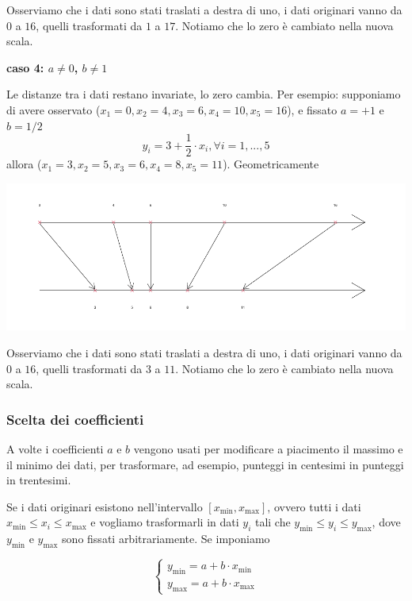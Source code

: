 \documentclass[
  11pt,
]{book}
\theoremstyle{mytheoremstyle}
\theoremstyle{mydefstyle}
\begin{document}
Osserviamo che i dati sono stati traslati a destra di uno, i dati originari vanno da \(0\) a \(16\), quelli trasformati da \(1\) a \(17\). Notiamo che lo zero è cambiato nella nuova scala.

\textbf{caso 4: \(a\ne 0\), \(b\ne 1\)}

Le distanze tra i dati restano invariate, lo zero cambia.
Per esempio: supponiamo di avere osservato (\(x_1=0, x_2=4, x_3=6, x_4=10, x_5=16\)), e fissato \(a=+1\) e \(b=1/2\)
\[
y_i= 3 + \frac 12 \cdot x_i, \forall i = 1,...,5
\]
allora (\(x_1=3, x_2=5, x_3=6, x_4=8, x_5=11\)). Geometricamente

\begin{center}\includegraphics{Appunti_di_Statistica_2025_files/figure-latex/tranf-lin-gr4-1} \end{center}

Osserviamo che i dati sono stati traslati a destra di uno, i dati originari vanno da \(0\) a \(16\), quelli trasformati da \(3\) a \(11\). Notiamo che lo zero è cambiato nella nuova scala.

\subsubsection{Scelta dei coefficienti}\label{scelta-dei-coefficienti}

A volte i coefficienti \(a\) e \(b\) vengono usati per modificare a piacimento il massimo e il minimo dei dati,
per trasformare, ad esempio, punteggi in centesimi in punteggi in trentesimi.

Se i dati originari esistono nell'intervallo \([x_{\min},x_{\max}]\), ovvero tutti i dati \(x_{\min}\le x_i\le x_{\max}\)
e vogliamo trasformarli in dati \(y_i\) tali che \(y_{\min}\le y_i\le y_{\max}\), dove \(y_{\min}\) e \(y_{\max}\) sono fissati arbitrariamente. Se imponiamo

\[
\begin{cases}
y_{\text{min}} = a + b \cdot x_{\text{min}} \\
y_{\text{max}} = a + b \cdot x_{\text{max}}
\end{cases}
\]
\end{document}
